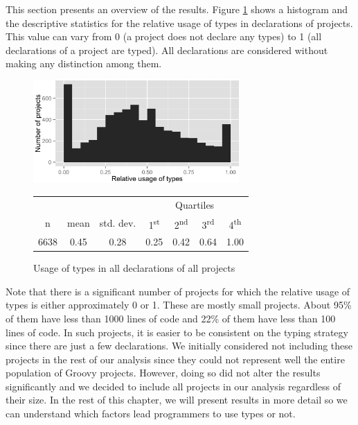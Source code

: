\documentclass[msc]{ppgccufmg}
\newcommand{\ts}{\textsuperscript}
\begin{document}
This section presents an overview of the results.
Figure \ref{fig:all_histogram_all} shows a histogram and the descriptive statistics for the relative usage of types in declarations of projects.
This value can vary from 0 (a project does not declare any types) to 1 (all declarations of a project are typed). 
All declarations are considered without making any distinction among them.

\begin{figure}[h]
\centering 
\includegraphics[width=0.7\textwidth]{../aosd_2014/analysis/result/all/histograms/5_all_types.png} 

\vspace{0.3cm}

\begin{tabular}{|c|c|c|cccc|}
\hline
{}		&  {}		&  {}			&  \multicolumn{4}{c|}{Quartiles}				\\
n		& mean	& std. dev.	& 1\ts{st}	& 2\ts{nd}	& 3\ts{rd}	& 4\ts{th}		\\
\hline
\hline
6638 	& 0.45	& 0.28		& 0.25	& 0.42		& 0.64	& 1.00		\\
\hline
\end{tabular}


\caption{Usage of types in all declarations of all projects}
\label{fig:all_histogram_all} 
\end{figure}

Note that there is a significant number of projects for which the relative usage of types is either approximately 0 or 1.
These are mostly small projects.
About 95\% of them have less than 1000 lines of code and 22\% of them have less than 100 lines of code.
In such projects, it is easier to be consistent on the typing strategy since there are just a few declarations.
We initially considered not including these projects in the rest of our analysis since they could not represent well the entire population of Groovy projects.
However, doing so did not alter the results significantly and we decided to include all projects in our analysis regardless of their size.
In the rest of this chapter, we will present results in more detail so we can understand which factors lead programmers to use types or not.
\end{document}
